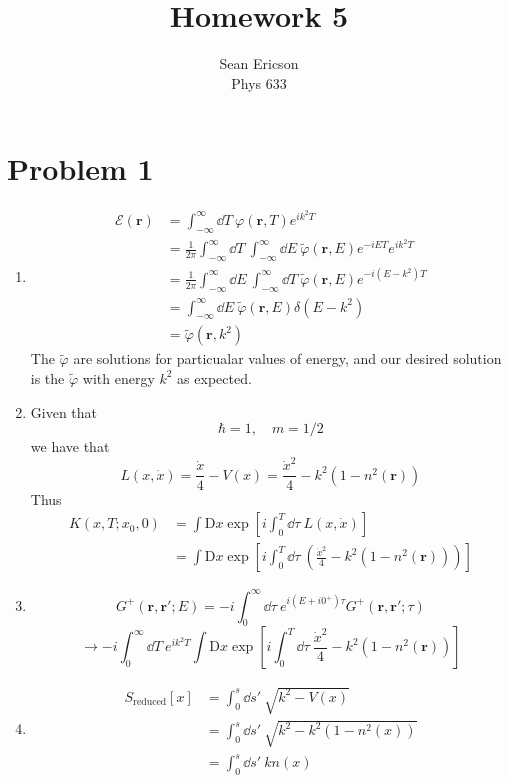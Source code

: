 \documentclass[12pt]{article}
\newcommand{\fullint}{\int_{-\infty}^\infty}
\newcommand{\fullintd}[1]{\fullint\dd#1\:}
\newcommand{\cint}[2]{\int_{#1}^{#2}}
\newcommand{\cintd}[3]{\cint{#1}{#2}\dd#3\:}
\begin{document}
	
\title{Homework 5}
\author{Sean Ericson \\ Phys 633}
\maketitle

\section*{Problem 1}
\begin{enumerate}[label=(\alph*)]
    \item
    \begin{align*}
        \mathscr{E}(\mathbf{r}) &= \fullintd{T}\varphi(\mathbf{r}, T)e^{ik^2T} \\
        &= \frac{1}{2\pi}\fullintd{T}\fullintd{E}\tilde{\varphi}(\mathbf{r},E)e^{-iET}e^{ik^2T} \\
        &= \frac{1}{2\pi}\fullintd{E}\fullintd{T}\tilde{\varphi}(\mathbf{r},E)e^{-i(E-k^2)T} \\
        &= \fullintd{E}\tilde{\varphi}(\mathbf{r},E)\delta(E - k^2) \\
        &= \tilde{\varphi}(\mathbf{r},k^2)
    \end{align*}
    The $\tilde{\varphi}$ are solutions for particualar values of energy, and our desired solution is the $\tilde{\varphi}$ with energy $k^2$ as expected.

    \item Given that 
    \[ \hbar = 1, \quad m = 1/2 \]
    we have that
    \[ L(x,\dot{x}) = \frac{\dot{x}}{4} - V(x) = \frac{\dot{x}^2}{4} - k^2(1 - n^2(\mathbf{r})) \]
    Thus
    \begin{align*}
        K(x,T;x_0,0) &= \int \text{D}x \exp[i\cintd{0}{T}{\tau}L(x,\dot{x})] \\
        &= \int \text{D}x \exp[i\cintd{0}{T}{\tau}\left(\frac{\dot{x}^2}{4} -k^2(1-n^2(\mathbf{r}))\right)]
    \end{align*}

    \item
    \[ G^+(\mathbf{r},\mathbf{r}';E) = -i\cintd{0}{\infty}{\tau}e^{i(E+i0^+)\tau}G^+(\mathbf{r},\mathbf{r}';\tau) \]
    \[ \to -i\cintd{0}{\infty}{T}e^{ik^2T}\int\text{D}x\exp[i\cintd{0}{T}{\tau}\frac{\dot{x}^2}{4} - k^2(1-n^2(\mathbf{r}))] \]

    \item
    \begin{align*}
        S_\text{reduced}[x] &= \cintd{0}{s}{s'}\sqrt{k^2 - V(x)} \\
        &= \cintd{0}{s}{s'} \sqrt{k^2 - k^2(1 - n^2(x))} \\
        &= \cintd{0}{s}{s'} kn(x)
    \end{align*}
\end{enumerate}
\end{document}
